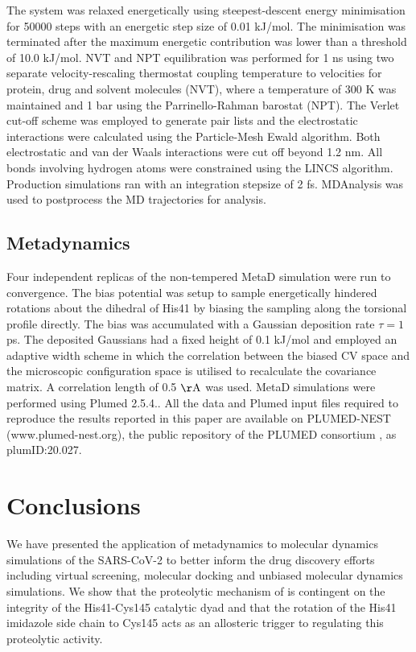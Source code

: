 The system was relaxed energetically using steepest-descent energy minimisation for 50000 steps with an energetic step size of 0.01 kJ/mol. The minimisation was terminated after the maximum energetic contribution was lower than a threshold of 10.0 kJ/mol. NVT and NPT equilibration was performed for 1 ns using two separate velocity-rescaling thermostat coupling temperature to velocities for protein, drug and solvent molecules (NVT), where a temperature of 300 K was maintained and 1 bar using the Parrinello-Rahman barostat (NPT).\cite{parrinello1981polymorphic} The Verlet cut-off scheme was employed to generate pair lists and the electrostatic interactions were calculated using the Particle-Mesh Ewald algorithm.\cite{pme} Both electrostatic and van der Waals interactions were cut off beyond 1.2 nm. All bonds involving hydrogen atoms were constrained using the LINCS algorithm.\cite{hess1997lincs} Production simulations ran with an integration stepsize of 2 fs. MDAnalysis was used to postprocess the MD trajectories for analysis.\cite{mdanalysis1, mdanalysis2}\\

\subsection{Metadynamics}
Four independent replicas of the non-tempered MetaD simulation were run to convergence.\cite{metaD} The bias potential was setup to sample energetically hindered rotations about the \dihtwo dihedral of His41 by biasing the sampling along the \dihone torsional profile directly. The bias was accumulated with a Gaussian deposition rate $\tau = 1$ ps. The deposited Gaussians had a fixed height of 0.1 kJ/mol and employed an adaptive width scheme in which the correlation between the biased CV space and the microscopic configuration space is utilised to recalculate the covariance matrix. A correlation length of 0.5 $\mathrm{\AA}$ was used.\cite{adaptive} MetaD simulations were performed using Plumed 2.5.4.\cite{plumed}. All the data and Plumed input files required to reproduce the results reported in this paper are available on PLUMED-NEST (www.plumed-nest.org), the public repository of the PLUMED consortium \cite{plumed}, as plumID:20.027. 
%
%
%
%
%
%
\section{Conclusions}
We have presented the application of metadynamics to molecular dynamics simulations of the SARS-CoV-2 \mpro to better inform the drug discovery efforts including virtual screening, molecular docking and unbiased molecular dynamics simulations. We show that the proteolytic mechanism of \mpro is contingent on the integrity of the His41-Cys145 catalytic dyad and that the rotation of the His41 imidazole side chain to Cys145 acts as an allosteric trigger to regulating this proteolytic activity.\\

